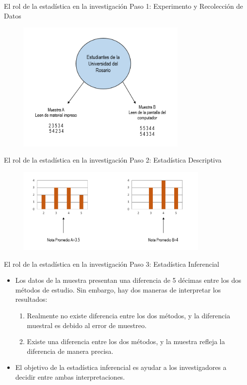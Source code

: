\documentclass[xcolor=dvipsnames]{beamer}
\begin{document}
\begin{frame}{El rol de la estadística en la investigación}
	{\sc Paso 1: Experimento y Recolección de Datos}
		\begin{figure}[H]
			\includegraphics[width = 0.75\textwidth]{./graf7}
		\end{figure}
\end{frame}

\begin{frame}{El rol de la estadística en la investigación}
	{\sc Paso 2: Estadística Descriptiva}
	\begin{figure}[H]
		\includegraphics[width = 0.85\textwidth]{./graf8}
	\end{figure}
\end{frame}

\begin{frame}{El rol de la estadística en la investigación}
	{\sc Paso 3: Estadística Inferencial}
\begin{itemize}
\justifying
\item Los datos de la muestra presentan una diferencia de 5 décimas entre los dos métodos de estudio. Sin embargo, hay dos maneras de interpretar los resultados:
\begin{enumerate}
	\justifying
	\item Realmente no existe diferencia entre los dos métodos, y la diferencia muestral es debido al error de muestreo.
	\item Existe una diferencia entre los dos métodos, y la muestra refleja la diferencia de manera precisa. 
\end{enumerate}
\item El objetivo de la estadística inferencial es ayudar a los investigadores a decidir entre ambas interpretaciones. 
\end{itemize}
\end{frame}
\end{document}
